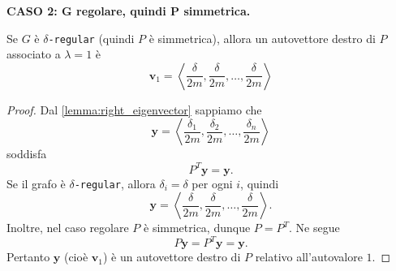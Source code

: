 \textbf{CASO 2: $\mathbf{G}$ regolare, quindi $\mathbf{P}$ simmetrica.}

\begin{lemma}
    Se $G$ è $\delta$\texttt{-regular} (quindi $P$ è simmetrica), allora un autovettore destro di $P$ associato a $\lambda=1$ è
    \[
    \mathbf{v}_1=\left\langle \frac{\delta}{2m},\frac{\delta}{2m},\dots,\frac{\delta}{2m}\right\rangle
    \]

    \begin{proof}
    Dal \autoref{lemma:right_eigenvector} sappiamo che
    \[
    \mathbf{y}=\left\langle \frac{\delta_1}{2m},\frac{\delta_2}{2m},\dots,\frac{\delta_n}{2m}\right\rangle
    \]
    soddisfa
    \[
    P^T\mathbf{y}=\mathbf{y}.
    \]
    Se il grafo è $\delta$\texttt{-regular}, allora $\delta_i=\delta$ per ogni $i$, quindi
    \[
    \mathbf{y}=\left\langle \frac{\delta}{2m},\frac{\delta}{2m},\dots,\frac{\delta}{2m}\right\rangle.
    \]
    Inoltre, nel caso regolare $P$ è simmetrica, dunque $P=P^T$. Ne segue
    \[
    P\mathbf{y}=P^T\mathbf{y}=\mathbf{y}.
    \]
    Pertanto $\mathbf{y}$ (cioè $\mathbf{v}_1$) è un autovettore destro di $P$ relativo all'autovalore $1$.
    \end{proof}
\end{lemma}

